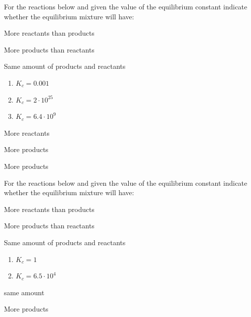 \documentclass[main.tex]{subfiles}
\begin{document}
\begin{multicols*}{2}
\begin{question}[ID=\the\value{numA}]
For the reactions below and given the value of the equilibrium constant indicate whether the equilibrium mixture will have:
\begin{inparaenum}[(a)]	
\item More reactants than products
\item More  products than reactants
\item Same amount of  products and reactants
 \end{inparaenum}
 \begin{enumerate}[label=(\alph*)]	
\item   {}\hfill $K_{c}=0.001$ %
\item {}\hfill$K_{c}=2\cdot 10^{25}$	%
\item {}\hfill $K_{c}=6.4\cdot 10^{9}$	%

 \end{enumerate}
\end{question}
\begin{solution}
\begin{inparaenum}[(a)]
\item    More reactants
\item  More products
\item  More products
 \end{inparaenum}
\hspace{0.1cm}\end{solution}%


\begin{question}[ID=\the\value{numA}]
For the reactions below and given the value of the equilibrium constant indicate whether the equilibrium mixture will have:
\begin{inparaenum}[(a)]	
\item More reactants than products
\item More  products than reactants
\item Same amount of  products and reactants
 \end{inparaenum}
 \begin{enumerate}[label=(\alph*)]	
\item {}\hfill$K_{c}=1$	%
\item	{}\hfill $K_{c}=6.5\cdot 10^{4}$ %
 \end{enumerate}
\end{question}
\begin{solution}
\begin{inparaenum}[(a)]
\item  same amount
\item	  More products
 \end{inparaenum}
\hspace{0.1cm}\end{solution}%



\end{multicols*}
\end{document}
